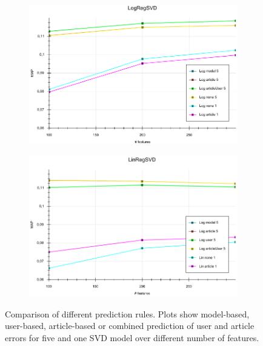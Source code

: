 \documentclass[10pt]{reportMaster}
\begin{document}
\begin{figure}
	\begin{subfigure}[c]{0.5\textwidth}
		\centering
		\includegraphics[width=1\textwidth]{figures/experiments/LogRegSVDPredictionOverFeatureNum}
	\end{subfigure}
	\begin{subfigure}[c]{0.5\textwidth}
		\centering
		\includegraphics[width=1\textwidth]{figures/experiments/LinRegSVDPredictionsOFeatures}
	\end{subfigure}
	\caption{Comparison of different prediction rules. Plots show model-based, user-based, article-based or combined prediction of user and article errors for five and one SVD model over different number of features.}
	\label{fig:LogRegSVDPredictions}
\end{figure}
\end{document}
